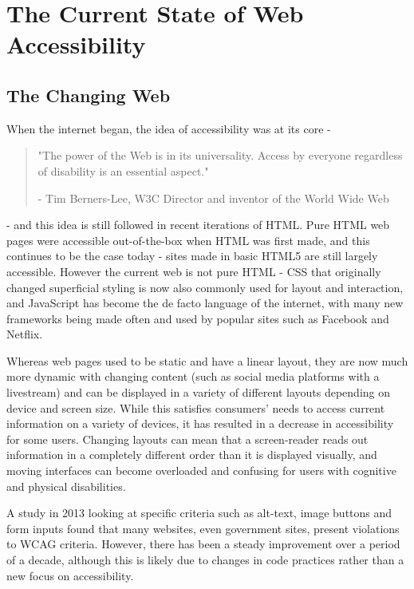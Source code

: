 \documentclass[ %
                    author={Aleena Baig},
                supervisor={Dr Simon Lock},
                    degree={BSc},
                     title={On Making Web Accessible Graphs},
                  subtitle={},
                      year={2019} ]{dissertation}
\begin{document}
\section{The Current State of Web Accessibility}

\subsection{The Changing Web}

When the internet began, the idea of accessibility was at its core -

\begin{quote}
\centering
"The power of the Web is in its universality. Access by everyone regardless of disability is an essential aspect."

- Tim Berners-Lee, W3C Director and inventor of the World Wide Web
\end{quote}
%
- and this idea is still followed in recent iterations of HTML. Pure HTML web pages were accessible out-of-the-box when HTML was first made, and this continues to be the case today - sites made in basic HTML5 are still largely accessible. However the current web is not pure HTML - CSS that originally changed superficial styling is now also commonly used for layout and interaction, and JavaScript has become the de facto language of the internet, with many new frameworks being made often and used by popular sites such as Facebook and Netflix.

Whereas web pages used to be static and have a linear layout, they are now much more dynamic with changing content (such as social media platforms with a livestream) and can be displayed in a variety of different layouts depending on device and screen size. While this satisfies consumers' needs to access current information on a variety of devices, it has resulted in a decrease in accessibility for some users. Changing layouts can mean that a screen-reader reads out information in a completely different order than it is displayed visually, and moving interfaces can become overloaded and confusing for users with cognitive and physical disabilities.

A study in 2013 looking at specific criteria such as alt-text, image buttons and form inputs found that many websites, even government sites, present violations to WCAG criteria. However, there has been a steady improvement over a period of a decade, although this is likely due to changes in code practices rather than a new focus on accessibility.\cite{progressaccessibility}
\end{document}
